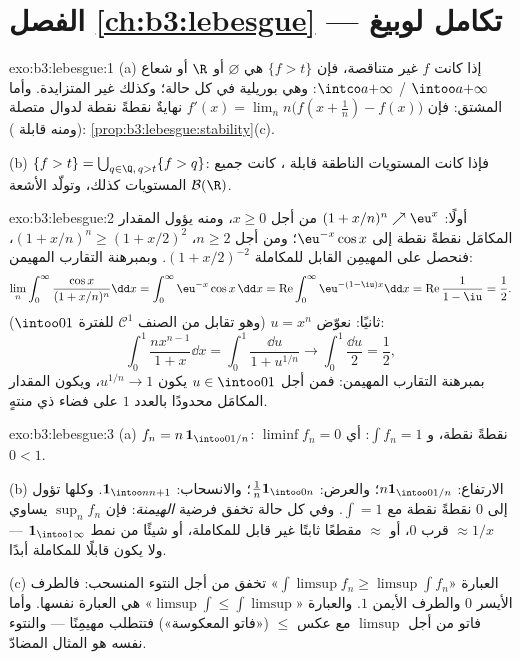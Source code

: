 \section*{الفصل \ref{ch:b3:lebesgue} --- تكامل
لوبيغ}

\begin{solution}{exo:b3:lebesgue:1}
(a) إذا كانت $f$ غير متناقصة، فإن $\{f > t\}$ هي $\varnothing$
أو $\R$ أو شعاع $\intoo a{+\infty}$ / $\intco a{+\infty}$: وهي بوريلية في كل حالة؛ وكذلك
غير المتزايدة. وأما المشتق: فإن $f'(x) =
\lim_n n\bigl(f(x + \frac1n) - f(x)\bigr)$ نهايةٌ نقطةً نقطة لدوال
متصلة (ومنه قابلة ): \cref{prop:b3:lebesgue:stability}(c).

(b) $\{f > t\} = \bigcup_{q \in \Q,\, q > t}\{f > q\}$: فإذا كانت المستويات الناطقة قابلة ، كانت جميع
المستويات كذلك، وتولّد الأشعة $\mathcal B(\R)$.
\end{solution}

\begin{solution}{exo:b3:lebesgue:2}
أولًا: $(1 + x/n)^n \nearrow \eu^x$ من أجل $x \geq 0$، ومنه يؤول المقدار المكامَل
نقطةً نقطة إلى $\eu^{-x}\cos x$؛ ومن أجل $n \geq 2$، $(1 + x/n)^n \geq (1 + x/2)^2$،
فنحصل على المهيمِن القابل للمكاملة $(1 + x/2)^{-2}$. وبمبرهنة
التقارب المهيمن:
\[
\lim_n\int_0^\infty\frac{\cos x}{(1 + x/n)^n}\dd x
= \int_0^\infty \eu^{-x}\cos x\,\dd x
= \operatorname{Re}\int_0^\infty\eu^{-(1 - \iu)x}\dd x
= \operatorname{Re}\frac{1}{1 - \iu} = \frac12 .
\]
ثانيًا: نعوّض $u = x^n$ (وهو تقابل من الصنف $\mathcal C^1$
للفترة $\intoo01$):
\[
\int_0^1\frac{nx^{n-1}}{1 + x}\dd x = \int_0^1\frac{\dd u}{1 +
u^{1/n}} \longrightarrow \int_0^1\frac{\dd u}{2} = \frac12,
\]
بمبرهنة التقارب المهيمن: فمن أجل $u \in \intoo01$ يكون
$u^{1/n} \to 1$، ويكون المقدار المكامَل محدودًا بالعدد $1$ على
فضاء ذي  منتهٍ.
\end{solution}

\begin{solution}{exo:b3:lebesgue:3}
(a) $f_n = n\,\mathbf 1_{\intoo0{1/n}}$: $\liminf f_n = 0$ نقطةً نقطة، و $\int f_n = 1$: أي $0 < 1$.

(b) الارتفاع: $n\mathbf 1_{\intoo0{1/n}}$؛ والعرض: $\frac1n\mathbf
1_{\intoo0n}$؛ والانسحاب: $\mathbf 1_{\intoo n{n+1}}$. وكلها
تؤول إلى $0$ نقطةً نقطة مع $\int = 1$. وفي كل حالة تخفق فرضية
\emph{الهيمنة}: فإن $\sup_nf_n$ يساوي $\approx 1/x$ قرب $0$،
أو $\approx$ مقطعًا ثابتًا غير قابل للمكاملة، أو شيئًا من نمط
$\mathbf 1_{\intoo1\infty}$ --- ولا يكون قابلًا للمكاملة أبدًا.

(c) العبارة «$\int\limsup f_n \geq \limsup\int f_n$» تخفق من أجل النتوء المنسحب: فالطرف الأيسر
$0$ والطرف الأيمن $1$. والعبارة «$\limsup\int \leq \int\limsup$» هي العبارة نفسها. وأما
فاتو من أجل $\limsup$ مع عكس $\leq$ («فاتو المعكوسة») فتتطلب
مهيمِنًا --- والنتوء نفسه هو المثال المضادّ.
\end{solution}


